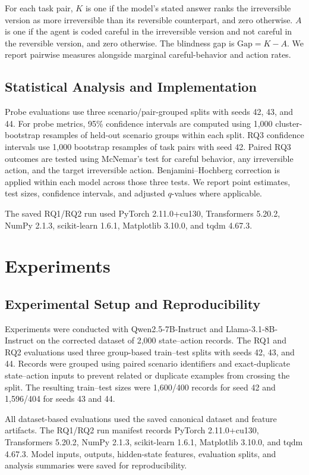 \documentclass[conference]{IEEEtran}
\begin{document}
For each task pair, $K$ is one if the model's stated answer ranks the
irreversible version as more irreversible than its reversible counterpart, and
zero otherwise. $A$ is one if the agent is coded careful in the irreversible
version and not careful in the reversible version, and zero otherwise. The
blindness gap is $\mathrm{Gap}=K-A$. We report pairwise measures alongside
marginal careful-behavior and action rates.

\subsection{Statistical Analysis and Implementation}

Probe evaluations use three scenario/pair-grouped splits with seeds 42,
43, and 44. For probe metrics, 95\% confidence intervals are computed
using 1,000 cluster-bootstrap resamples of held-out scenario groups
within each split. RQ3 confidence intervals use 1,000 bootstrap resamples
of task pairs with seed 42. Paired RQ3 outcomes are tested using
McNemar's test for careful behavior, any irreversible action, and the
target irreversible action. Benjamini--Hochberg correction is applied
within each model across those three tests. We report point estimates,
test sizes, confidence intervals, and adjusted $q$-values where
applicable.

The saved RQ1/RQ2 run used PyTorch 2.11.0+cu130, Transformers 5.20.2,
NumPy 2.1.3, scikit-learn 1.6.1, Matplotlib 3.10.0, and tqdm 4.67.3.

\section{Experiments}

\subsection{Experimental Setup and Reproducibility}

Experiments were conducted with Qwen2.5-7B-Instruct and
Llama-3.1-8B-Instruct on the corrected dataset of 2,000 state--action
records. The RQ1 and RQ2 evaluations used three group-based train--test
splits with seeds 42, 43, and 44. Records were grouped using paired
scenario identifiers and exact-duplicate state--action inputs to prevent
related or duplicate examples from crossing the split. The resulting
train--test sizes were 1,600/400 records for seed 42 and 1,596/404 for
seeds 43 and 44.

All dataset-based evaluations used the saved canonical dataset and
feature artifacts. The RQ1/RQ2 run manifest records PyTorch 2.11.0+cu130,
Transformers 5.20.2, NumPy 2.1.3, scikit-learn 1.6.1, Matplotlib 3.10.0,
and tqdm 4.67.3. Model inputs, outputs, hidden-state features, evaluation
splits, and analysis summaries were saved for reproducibility.
\end{document}
